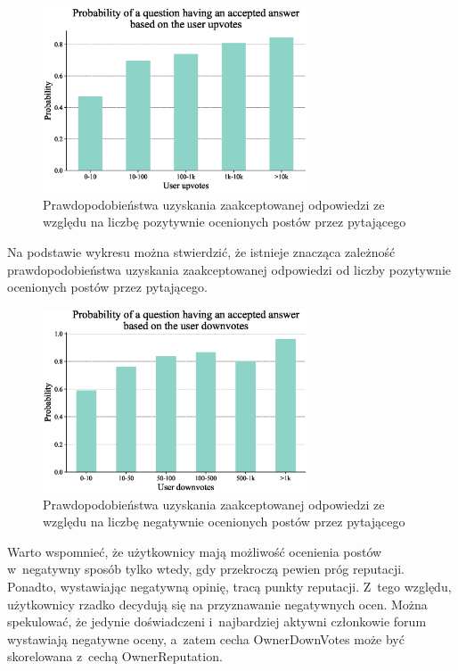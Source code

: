 \documentclass[12pt]{article}
\begin{document}
	\begin{figure}[H]
		\centering
		\includegraphics[width=0.7\textwidth]{user_upvotes}
		\caption{Prawdopodobieństwa uzyskania zaakceptowanej odpowiedzi ze względu na liczbę pozytywnie ocenionych postów przez pytającego}
		\label{fig:prawdopodobienstwa-uzyskania-odpowiedzi-upvotes}
	\end{figure}
	Na podstawie wykresu można stwierdzić, że istnieje znacząca zależność prawdopodobieństwa uzyskania zaakceptowanej odpowiedzi od liczby pozytywnie ocenionych postów przez pytającego.

	\begin{figure}[H]
		\centering
		\includegraphics[width=0.7\textwidth]{user_downvotes}
		\caption{Prawdopodobieństwa uzyskania zaakceptowanej odpowiedzi ze względu na liczbę negatywnie ocenionych postów przez pytającego}
		\label{fig:prawdopodobienstwa-uzyskania-odpowiedzi-downvotes}
	\end{figure}
	Warto wspomnieć, że użytkownicy mają możliwość ocenienia postów w~negatywny sposób tylko wtedy, gdy przekroczą pewien próg reputacji.
	Ponadto, wystawiając negatywną opinię, tracą punkty reputacji.
	Z~tego względu, użytkownicy rzadko decydują się na przyznawanie negatywnych ocen.
	Można spekulować, że jedynie doświadczeni i~najbardziej aktywni członkowie forum wystawiają negatywne oceny, a~zatem cecha OwnerDownVotes może być skorelowana z~cechą OwnerReputation.
\end{document}
